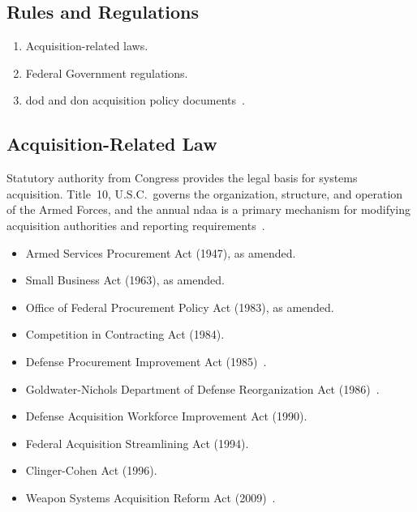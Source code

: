 \documentclass[../main.tex]{subfiles}
\begin{document}
\subsection{Rules and Regulations}
\begin{enumerate}
  \item Acquisition-related laws.
  \item Federal Government regulations.
  \item \ac{dod} and \ac{don} acquisition policy documents~\autocite{edo-3-3-1-acq-policy-players-2025}.
\end{enumerate}

\subsection{Acquisition-Related Law}
Statutory authority from Congress provides the legal basis for systems acquisition. Title~10, U.S.C.\ governs the organization, structure, and operation of the Armed Forces, and the annual \ac{ndaa} is a primary mechanism for modifying acquisition authorities and reporting requirements~\autocite{edo-3-3-1-acq-policy-players-2025}.

\begin{itemize}
  \item Armed Services Procurement Act (1947), as amended.
  \item Small Business Act (1963), as amended.
  \item Office of Federal Procurement Policy Act (1983), as amended.
  \item Competition in Contracting Act (1984).
  \item Defense Procurement Improvement Act (1985)~\autocite{Defense-Procurement-Improvement-1985}.
  \item Goldwater-Nichols Department of Defense Reorganization Act (1986)~\autocite{Goldwater-Nichols-1986}.
  \item Defense Acquisition Workforce Improvement Act (1990).
  \item Federal Acquisition Streamlining Act (1994).
  \item Clinger-Cohen Act (1996).
  \item Weapon Systems Acquisition Reform Act (2009)~\autocite{edo-3-3-1-acq-policy-players-2025}.
\end{itemize}
\end{document}
